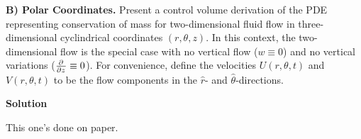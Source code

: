 \documentclass{article}
\begin{document}
\newpage

\textbf{B) Polar Coordinates.} Present a control volume derivation of
the PDE representing conservation of mass for two-dimensional fluid flow
in three-dimensional cyclindrical coordinates $(r, \theta, z)$. In this
context, the two-dimensional flow is the special case with no vertical
flow ($w \equiv 0$) and no vertical variations ($\pd{}{z} \equiv 0$).
For convenience, define the velocities $U(r, \theta, t)$ and $V(r,
\theta, t)$ to be the flow components in the $\hat{r}$- and
$\hat{\theta}$-directions.

\textbf{Solution}

This one's done on paper.
\end{document}
